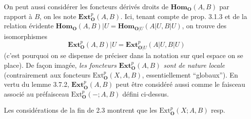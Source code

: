 On peut aussi considérer les foncteurs dérivés droits de
$\mathbf{Hom}_{\mathbf O}(A,B)$ par rapport à $B$, on les note
$\mathbf{Ext}_{\mathbf O}^p(A,B)$. Ici, tenant compte de prop. 3.1.3 et de la relation
évidente
$\mathbf{Hom}_{\mathbf O}(A,B)|U=\mathbf{Hom}_{{\mathbf O}|U}(A|U,B|U)$, on trouve des
isomorphismes
\[
\tag{4.2.3}
\mathbf{Ext}_{\mathbf O}^p(A,B)|U=
\mathbf{Ext}_{{\mathbf O}|U}^p(A|U,B|U)
\]
(c'est pourquoi on se dispense de préciser dans la notation sur quel espace
on se place). De façon imagée, \textit{les foncteurs
$\mathbf{Ext}_{\mathbf O}^p(A,B)$ sont de nature locale} (contrairement aux foncteurs
$\mathrm{Ext}_{\mathbf O}^p(X,A,B)$, essentiellement ``globaux''). En vertu du lemme
3.7.2, $\mathbf{Ext}_{\mathbf O}^p(A,B)$ peut être considéré aussi comme le faisceau
associé au préfaisceau $\mathrm{Ext}_{\mathbf O}^p(-;A,B)$ défini ci-dessus.

Les considérations de la fin de 2.3 montrent que les
$\mathrm{Ext}_{\mathbf O}^p(X;A,B)$ resp.

